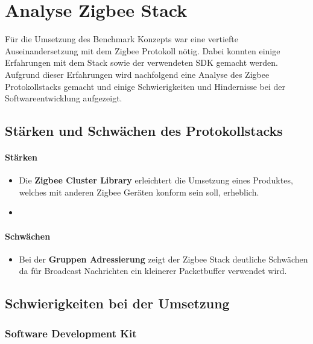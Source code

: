 \clearpage
\section{Analyse Zigbee Stack}\label{sec:AnalyseZigbeeStack}

Für die Umsetzung des Benchmark Konzepts war eine vertiefte Auseinandersetzung mit dem Zigbee Protokoll nötig.
Dabei konnten einige Erfahrungen mit dem Stack sowie der verwendeten SDK gemacht werden.
Aufgrund dieser Erfahrungen wird nachfolgend eine Analyse des Zigbee Protokollstacks gemacht und einige Schwierigkeiten und Hindernisse bei der Softwareentwicklung aufgezeigt.


\subsection{Stärken und Schwächen des Protokollstacks}\label{subsec:ZigbeeStärkenundSchwächendesProtokollstacks}

\paragraph{Stärken}

\begin{itemize}
\item Die \textbf{Zigbee Cluster Library} erleichtert die Umsetzung eines Produktes, welches mit anderen Zigbee Geräten konform sein soll, erheblich.
\item 
\end{itemize}

\paragraph{Schwächen}
\begin{itemize}
\item Bei der \textbf{Gruppen Adressierung} zeigt der Zigbee Stack deutliche Schwächen da für Broadcast Nachrichten ein kleinerer Packetbuffer verwendet wird.
\end{itemize}


\subsection{Schwierigkeiten bei der Umsetzung}\label{subsec:ZigbeeSchwierigkeitenbeiderUmsetzung}

\subsubsection{Software Development Kit}\label{subsubsec:ZigbeeSoftwareDevelopmentKit}

